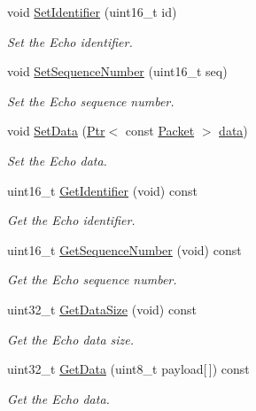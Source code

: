\begin{DoxyCompactItemize}
\item 
void \hyperlink{classns3_1_1Icmpv4Echo_a4d465f33a95a05c6485d5b3524a20e2a}{Set\+Identifier} (uint16\+\_\+t id)
\begin{DoxyCompactList}\small\item\em Set the Echo identifier. \end{DoxyCompactList}\item 
void \hyperlink{classns3_1_1Icmpv4Echo_acb08fd7a4a626ed59528d0e2a3b50feb}{Set\+Sequence\+Number} (uint16\+\_\+t seq)
\begin{DoxyCompactList}\small\item\em Set the Echo sequence number. \end{DoxyCompactList}\item 
void \hyperlink{classns3_1_1Icmpv4Echo_a5f975e51b5cfd4f48339ddbca214bc0d}{Set\+Data} (\hyperlink{classns3_1_1Ptr}{Ptr}$<$ const \hyperlink{classns3_1_1Packet}{Packet} $>$ \hyperlink{topology-example-sim_8cc_a26c65296e316af77b787dc77469bb2a4}{data})
\begin{DoxyCompactList}\small\item\em Set the Echo data. \end{DoxyCompactList}\item 
uint16\+\_\+t \hyperlink{classns3_1_1Icmpv4Echo_a88cf968ec0cf8ba44e9dc7e29c83a02d}{Get\+Identifier} (void) const 
\begin{DoxyCompactList}\small\item\em Get the Echo identifier. \end{DoxyCompactList}\item 
uint16\+\_\+t \hyperlink{classns3_1_1Icmpv4Echo_aa1c1707ab7837e3d44b925ac794e9510}{Get\+Sequence\+Number} (void) const 
\begin{DoxyCompactList}\small\item\em Get the Echo sequence number. \end{DoxyCompactList}\item 
uint32\+\_\+t \hyperlink{classns3_1_1Icmpv4Echo_a475b63b87d80340d3d72ee1bcbb4005c}{Get\+Data\+Size} (void) const 
\begin{DoxyCompactList}\small\item\em Get the Echo data size. \end{DoxyCompactList}\item 
uint32\+\_\+t \hyperlink{classns3_1_1Icmpv4Echo_a20b0b7e65ebe2986d1820b055f14ea64}{Get\+Data} (uint8\+\_\+t payload\mbox{[}$\,$\mbox{]}) const 
\begin{DoxyCompactList}\small\item\em Get the Echo data. \end{DoxyCompactList}\item 

\end{DoxyCompactItemize}
